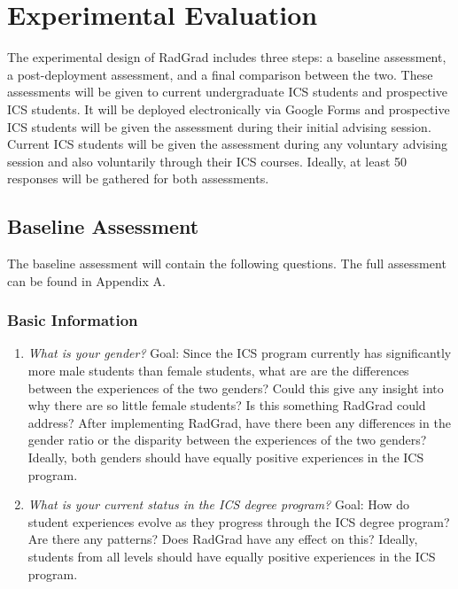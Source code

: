 \chapter{Experimental Evaluation}
\label{experimentalEvaluation}
The experimental design of RadGrad includes three steps: a baseline assessment, a post-deployment assessment, and a final comparison between the two. These assessments will be given to current undergraduate ICS students and prospective ICS students. It will be deployed electronically via Google Forms and prospective ICS students will be given the assessment during their initial advising session. Current ICS students will be given the assessment during any voluntary advising session and also voluntarily through their ICS courses. Ideally, at least 50 responses will be gathered for both assessments.
\section{Baseline Assessment}
\label{baselineAssessment}
	The baseline assessment will contain the following questions. The full assessment can be found in Appendix A. 

\subsection{Basic Information}
\begin{enumerate}
\item \textit{What is your gender? }
Goal: Since the ICS program currently has significantly more male students than female students, what are are the differences between the experiences of the two genders? Could this give any insight into why there are so little female students? Is this something RadGrad could address? After implementing RadGrad, have there been any differences in the gender ratio or the disparity between the experiences of the two genders? Ideally, both genders should have equally positive experiences in the ICS program.
\item \textit{What is your current status in the ICS degree program?}
Goal: How do student experiences evolve as they progress through the ICS degree program? Are there any patterns? Does RadGrad have any effect on this? Ideally, students from all levels should have equally positive experiences in the ICS program. 
\end{enumerate}

